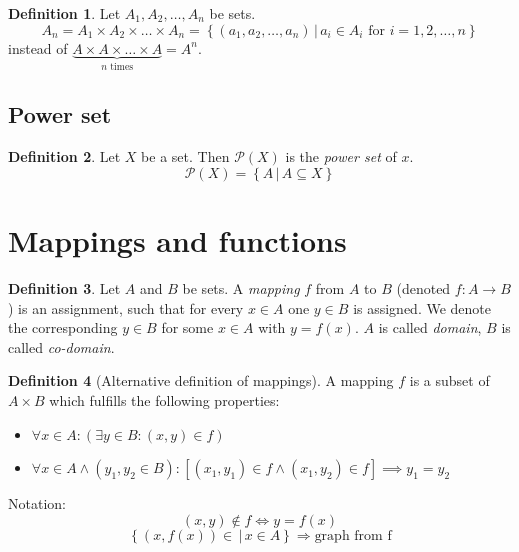 \documentclass[a4paper,landscape,twocolumn]{article}
\theoremstyle{definition}
\newtheorem{defi}{Definition}
\newcommand\setdef[2]{\left\{#1\,|\,#2\right\}}
\begin{document}
\begin{defi}
  Let $A_1, A_2, \dots, A_n$ be sets.
  \[ A_n = A_1 \times A_2 \times \dots \times A_n = \setdef{(a_1, a_2, \dots, a_n)}{a_i \in A_i \text{ for } i = 1, 2, \dots, n} \]
  instead of $\underbrace{A \times A \times \dots \times A}_{n \text{ times}} = A^n$.
\end{defi}

\subsection{Power set}
\begin{defi}
  Let $X$ be a set. Then $\mathcal P(X)$ is the \emph{power set} of $x$.
  \[ \mathcal P(X) = \setdef{A}{A \subseteq X} \]
\end{defi}

\section{Mappings and functions}
\begin{defi}
  Let $A$ and $B$ be sets.
  A \emph{mapping} $f$ from $A$ to $B$ (denoted $f: A \rightarrow B$) is an assignment,
  such that for every $x \in A$ one $y \in B$ is assigned. We denote the corresponding
  $y \in B$ for some $x \in A$ with $y = f(x)$.
  $A$ is called \emph{domain}, $B$ is called \emph{co-domain}.
\end{defi}

\begin{defi}[Alternative definition of mappings]
  A mapping $f$ is a subset of $A \times B$ which fulfills the following properties:
  \begin{itemize}
    \item $\forall x \in A: \left(\exists y \in B: (x, y) \in f\right)$
    \item $\forall x \in A \land (y_1, y_2 \in B): \left[(x_1,y_1) \in f \land (x_1, y_2) \in f\right] \implies y_1 = y_2$
  \end{itemize}
  Notation:
  \[ (x, y) \not\in f \Leftrightarrow y = f(x) \]
  \[ \setdef{(x, f(x)) \in}{x \in A} \Rightarrow \text{graph from f} \]
\end{defi}
\end{document}
